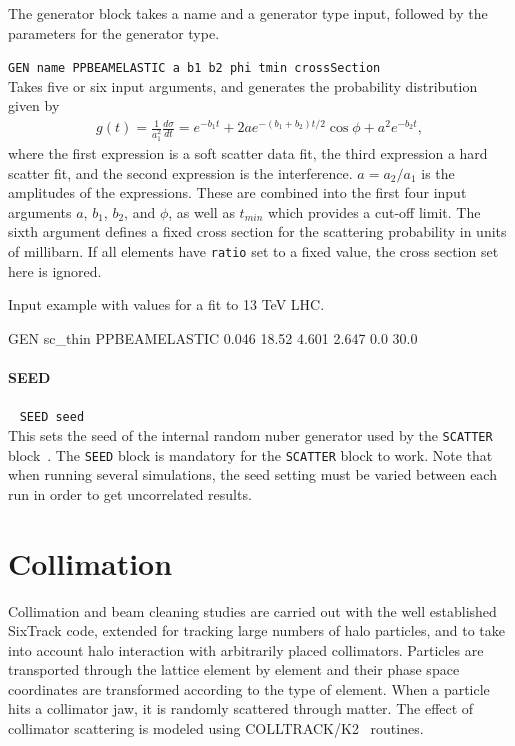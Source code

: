 The generator block takes a name and a generator type input, followed by the parameters for the
generator type.

\bigskip
\noindent\texttt{GEN name PPBEAMELASTIC a b1 b2 phi tmin crossSection} \\

Takes five or six input arguments, and generates the probability distribution given by
\begin{align}
    g(t) = \frac{1}{a_1^2}\frac{d\sigma}{dt} = e^{-b_1 t}+ 2ae^{-(b_1+b_2)t/2}\cos{\phi} + a^2e^{-b_2 t},
\end{align}
where the first expression is a soft scatter data fit, the third expression a hard scatter fit, and the second expression is the interference. $a = a_2/a_1$ is the amplitudes of the expressions.
These are combined into the first four input arguments $a$, $b_1$, $b_2$, and $\phi$, as well as $t_{min}$ which provides a cut-off limit.
The sixth argument defines a fixed cross section for the scattering probability in units of millibarn.
If all elements have \texttt{ratio} set to a fixed value, the cross section set here is ignored.

Input example with values for a fit to 13 TeV LHC.
\begin{cverbatim}
GEN  sc_thin     PPBEAMELASTIC 0.046 18.52 4.601 2.647 0.0 30.0
\end{cverbatim}

\paragraph{SEED}~ \texttt{SEED seed}\\

This sets the seed of the internal random nuber generator used by the \texttt{SCATTER} block~\cite{RANECU}.
The \texttt{SEED} block is mandatory for the \texttt{SCATTER} block to work.
Note that when running several simulations, the seed setting must be varied between each run in order to get uncorrelated results.

\section{Collimation} \label{sec:collimat}

Collimation and beam cleaning studies are carried out with the well established SixTrack code, extended for tracking large numbers of halo particles, and to take into account halo interaction with arbitrarily placed collimators.
Particles are transported through the lattice element by element and their phase space coordinates are transformed according to the type of element. When a particle hits a collimator jaw, it is randomly scattered through matter.
The effect of collimator scattering is modeled using COLLTRACK/K2~\cite{collimat:trenkler,collimat:robert_demolaize} routines.

